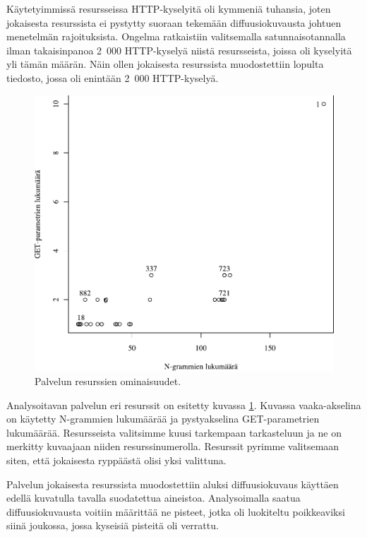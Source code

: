 Käytetyimmissä resursseissa HTTP-kyselyitä oli kymmeniä tuhansia,
joten jokaisesta resurssista ei pystytty suoraan tekemään
diffuusiokuvausta johtuen menetelmän rajoituksista. Ongelma
ratkaistiin valitsemalla satunnaisotannalla ilman takaisinpanoa 2~000
HTTP-kyselyä niistä resursseista, joissa oli kyselyitä yli tämän
määrän. Näin ollen jokaisesta resurssista muodostettiin lopulta
tiedosto, jossa oli enintään 2~000 HTTP-kyselyä.

\begin{figure}[hb]
\centering
\includegraphics[width=13cm]{pics/service_resources.pdf}
\caption{Palvelun resurssien ominaisuudet.}
\label{service_resources}
\end{figure}

Analysoitavan palvelun eri resurssit on esitetty kuvassa
\ref{service_resources}. Kuvassa vaaka-\-akselina on käytetty
N-grammien lukumäärää ja pystyakselina GET-parametrien
lukumäärää. Resursseista valitsimme kuusi tarkempaan tarkasteluun ja
ne on merkitty kuvaajaan niiden resurssinumerolla.  Resurssit pyrimme
valitsemaan siten, että jokaisesta ryppäästä olisi yksi valittuna.

Palvelun jokaisesta resurssista muodostettiin aluksi diffuusiokuvaus
käyttäen edellä kuvatulla tavalla suodatettua aineistoa.
Analysoimalla saatua diffuusiokuvausta voitiin määrittää ne pisteet,
jotka oli luokiteltu poikkeaviksi siinä joukossa, jossa kyseisiä
pisteitä oli verrattu. 

